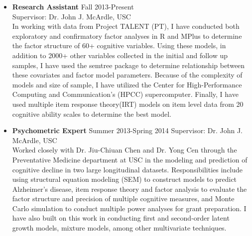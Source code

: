\documentclass[letterpaper,10pt]{article}
\begin{document}
\begin{itemize}
%
\item \textbf{Research Assistant} {Fall 2013-Present }\\
Supervisor: Dr. John J. McArdle, USC\\ 
In working with data from Project TALENT (PT), I have conducted both exploratory and confirmatory factor analyses in R and MPlus to determine the factor structure of 60+ cognitive variables. Using these models, in addition to 2000+ other variables collected in the initial and follow up samples, I have used the semtree package to determine relationship between these covariates and factor model parameters. Because of the complexity of models and size of sample, I have utilized the Center for High-Performance Computing and Communication's (HPCC) supercomputer. Finally, I have used multiple item response theory(IRT) models on item level data from 20 cognitive ability scales to determine the best model.
%
\item \textbf{Psychometric Expert} {Summer 2013-Spring 2014}
Supervisor: Dr. John J. McArdle, USC\\ 
Worked closely with Dr. Jiu-Chiuan Chen and Dr. Yong Cen through the Preventative Medicine department at USC in the modeling and prediction of cognitive decline in two large longitudinal datasets. Responsibilities include using structural equation modeling (SEM) to construct models to predict Alzheimer's disease, item response theory and factor analysis to evaluate the factor structure and precision of multiple cognitive measures, and Monte Carlo simulation to conduct multiple power analyses for grant preparation. I have also built on this work in conducting first and second-order latent growth models, mixture models, among other multivariate techniques. 


\end{itemize}
\end{document}
